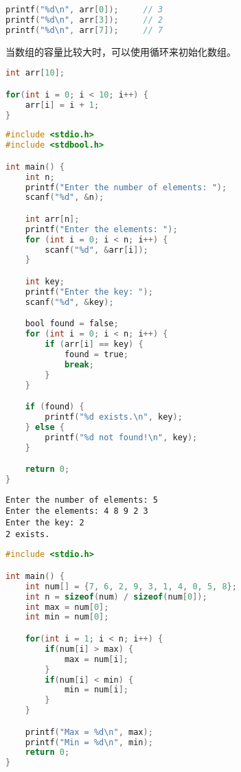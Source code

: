 \begin{lstlisting}[language=C]
printf("%d\n", arr[0]);		// 3
printf("%d\n", arr[3]);		// 2
printf("%d\n", arr[7]);		// 7
\end{lstlisting}

当数组的容量比较大时，可以使用循环来初始化数组。

\vspace{-0.5cm}

\begin{lstlisting}[language=C]
int arr[10];

for(int i = 0; i < 10; i++) {
	arr[i] = i + 1;
}
\end{lstlisting}

\vspace{0.5cm}


\begin{lstlisting}[language=C]
#include <stdio.h>
#include <stdbool.h>

int main() {
	int n;
	printf("Enter the number of elements: ");
	scanf("%d", &n);

	int arr[n];
	printf("Enter the elements: ");
	for (int i = 0; i < n; i++) {
		scanf("%d", &arr[i]);
	}

	int key;
	printf("Enter the key: ");
	scanf("%d", &key);

	bool found = false;
	for (int i = 0; i < n; i++) {
		if (arr[i] == key) {
			found = true;
			break;
		}
	}

	if (found) {
		printf("%d exists.\n", key);
	} else {
		printf("%d not found!\n", key);
	}

	return 0;
}
\end{lstlisting}

\begin{tcolorbox}
	\begin{verbatim}
Enter the number of elements: 5
Enter the elements: 4 8 9 2 3
Enter the key: 2
2 exists.
	\end{verbatim}
\end{tcolorbox}

\vspace{0.5cm}


\begin{lstlisting}[language=C]
#include <stdio.h>

int main() {
	int num[] = {7, 6, 2, 9, 3, 1, 4, 0, 5, 8};
	int n = sizeof(num) / sizeof(num[0]);
	int max = num[0];
	int min = num[0];

	for(int i = 1; i < n; i++) {
		if(num[i] > max) {
			max = num[i];
		}
		if(num[i] < min) {
			min = num[i];
		}
	}

	printf("Max = %d\n", max);
	printf("Min = %d\n", min);
	return 0;
}
\end{lstlisting}

